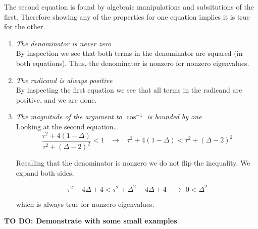 \documentclass{article}
\begin{document}
The second equation is found by algebraic manipulations and subsitutions
of the first. Therefore showing any of the properties for one equation
implies it is true for the other. \\

\begin{enumerate}
\def\labelenumi{\arabic{enumi}.}
\itemsep1pt\parskip0pt
\item
    \emph{The denominator is never zero} \\
  By inspection we see that both terms in the denominator are
  squared (in both equations). Thus, the denominator is nonzero for
  nonzero eigenvalues. \\
\item
    \emph{The radicand is always positive} \\
By inspecting the first equation we see that all terms in
the radicand are positive, and we are done. \\
\item
    \emph{The magnitude of the argument to $\cos^{-1}$ is bounded by one} \\
Looking at the second equation\ldots{} \\

\[\frac{\tau^2+4(1-\Delta)}{\tau^2+(\Delta-2)^2} < 1 \hspace{10pt} \rightarrow \hspace{10pt} \tau^2+4(1-\Delta) < \tau^2+(\Delta-2)^2\]

Recalling that the denominator is nonzero we do not flip the inequality.
We expand both sides,

\[\tau^2-4\Delta+4 < \tau^2+\Delta^2-4\Delta+4 \hspace{10pt} \rightarrow \hspace{4pt} 0 < \Delta^2\]

which is always true for nonzero eigenvalues. \\

\end{enumerate}

\textbf{TO DO: Demonstrate with some small examples} \\

    
    
    
\end{document}
